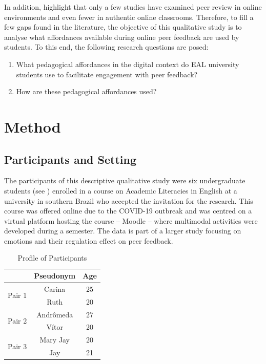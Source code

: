\documentclass[english]{textolivre}
\begin{document}
In addition, \textcite{payant2022learners} highlight that only a few studies have examined peer review in online environments and even fewer in authentic online classrooms. Therefore, to fill a few gaps found in the literature, the objective of this qualitative study is to analyse what affordances available during online peer feedback are used by students. To this end, the following research questions are posed:

\begin{enumerate}
    \item What pedagogical affordances in the digital context do EAL university students use to facilitate engagement with peer feedback?
    \item How are these pedagogical affordances used?
\end{enumerate}

\section{Method}

\subsection{Participants and Setting}

The participants of this descriptive qualitative study were six undergraduate students (see ) enrolled in a course on Academic Literacies in English at a university in southern Brazil who accepted the invitation for the research. This course was offered online due to the COVID-19 outbreak and was centred on a virtual platform hosting the course – Moodle – where multimodal activities were developed during a semester. The data is part of a larger study focusing on emotions and their regulation effect on peer feedback.


\begin{table}[h!]
\centering
\begin{threeparttable}
\caption{Profile of Participants}
\label{tab1}
\begin{tabular}{ccc}
\toprule
\multicolumn{1}{l}{}    & Pseudonym & Age \\
\midrule
\multirow{2}{*}{Pair 1} & Carina    & 25  \\
                        & Ruth      & 20  \\[1ex]
\multirow{2}{*}{Pair 2} & Andrômeda & 27  \\
                        & Vítor\footnotemark[1] & 20  \\[1ex]
\multirow{2}{*}{Pair 3} & Mary Jay  & 20  \\
                        & Jay       & 21 \\
\bottomrule
\end{tabular}
\end{threeparttable}
\end{table}
\end{document}
